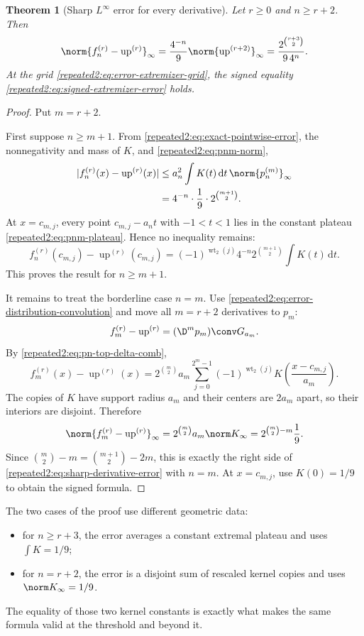\documentclass[11pt,oneside]{article}
\newtheorem{theorem}{Theorem}[section]
\theoremstyle{definition}
\theoremstyle{remark}
\newcommand{\Up}{\operatorname{up}}
\newcommand{\wt}{\operatorname{wt}_2}
\newcommand{\dd}{\,\mathrm d}
\begin{document}
\begin{theorem}[Sharp $L^\infty$ error for every derivative]
\label{repeated2:thm:sharp-derivative-error}
Let $r\ge0$ and $n\ge r+2$.  Then
\begin{equation}
 \norm{f_n^{(r)}-\Up^{(r)}}_\infty
 =\frac{4^{-n}}{9}\norm{\Up^{(r+2)}}_\infty
 =\frac{2^{\binom{r+3}{2}}}{9\,4^n}.
 \label{repeated2:eq:sharp-derivative-error}
\end{equation}
At the grid \eqref{repeated2:eq:error-extremizer-grid}, the signed equality
\eqref{repeated2:eq:signed-extremizer-error} holds.
\end{theorem}

\begin{proof}
Put $m=r+2$.

First suppose $n\ge m+1$.  From \eqref{repeated2:eq:exact-pointwise-error}, the nonnegativity and
mass of $K$, and \eqref{repeated2:eq:pnm-norm},
\begin{align*}
 |f_n^{(r)}(x)-\Up^{(r)}(x)|
 &\le a_n^2\int K(t)\dd t\,\norm{p_n^{(m)}}_\infty\\
 &=4^{-n}\cdot\frac19\cdot2^{\binom{m+1}{2}}.
\end{align*}
At $x=c_{m,j}$, every point $c_{m,j}-a_nt$ with $-1<t<1$ lies in the constant plateau
\eqref{repeated2:eq:pnm-plateau}.  Hence no inequality remains:
\[
 f_n^{(r)}(c_{m,j})-\Up^{(r)}(c_{m,j})
 =(-1)^{\wt(j)}4^{-n}2^{\binom{m+1}{2}}\int K(t)\dd t.
\]
This proves the result for $n\ge m+1$.

It remains to treat the borderline case $n=m$.  Use
\eqref{repeated2:eq:error-distribution-convolution} and move all $m=r+2$ derivatives to $p_m$:
\[
 f_m^{(r)}-\Up^{(r)}=(\D^mp_m)\conv G_{a_m}.
\]
By \eqref{repeated2:eq:pn-top-delta-comb},
\begin{equation}
 f_m^{(r)}(x)-\Up^{(r)}(x)
 =2^{\binom m2}a_m
 \sum_{j=0}^{2^m-1}(-1)^{\wt(j)}
 K\left(\frac{x-c_{m,j}}{a_m}\right).
 \label{repeated2:eq:borderline-error-kernel-copies}
\end{equation}
The copies of $K$ have support radius $a_m$ and their centers are $2a_m$ apart, so their
interiors are disjoint.  Therefore
\[
 \norm{f_m^{(r)}-\Up^{(r)}}_\infty
 =2^{\binom m2}a_m\norm K_\infty
 =2^{\binom m2-m}\frac19.
\]
Since
$\binom m2-m=\binom{m+1}{2}-2m$, this is exactly the right side of
\eqref{repeated2:eq:sharp-derivative-error} with $n=m$.  At $x=c_{m,j}$, use $K(0)=1/9$ to obtain
the signed formula.
\end{proof}

The two cases of the proof use different geometric data:
\begin{itemize}
\item for $n\ge r+3$, the error averages a constant extremal plateau and uses
$\int K=1/9$;
\item for $n=r+2$, the error is a disjoint sum of rescaled kernel copies and uses
$\norm K_\infty=1/9$.
\end{itemize}
The equality of those two kernel constants is exactly what makes the same formula valid at
the threshold and beyond it.
\end{document}
